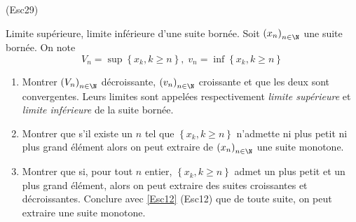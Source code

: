 \begin{tiny}(Esc29)\end{tiny} Limite supérieure, limite inférieure d'une suite bornée. \label{Esc29}
Soit $\left( x_n\right)_{n\in \N}$ une suite bornée. On note
\begin{displaymath}
  V_n=\sup \left\lbrace  x_k, k\geq n\right\rbrace,\; 
  v_n=\inf \left\lbrace  x_k, k\geq n\right\rbrace
\end{displaymath}
\begin{enumerate}
  \item Montrer $\left( V_n\right)_{n\in \N}$ décroissante, $\left( v_n\right)_{n\in \N}$ croissante et que les deux sont convergentes. Leurs limites sont appelées respectivement \emph{limite supérieure} et \emph{limite inférieure} de la suite bornée.
  \item Montrer que s'il existe un $n$ tel que $\left\lbrace  x_k, k\geq n\right\rbrace$ n'admette ni plus petit ni plus grand élément alors on peut extraire de $\left( x_n\right)_{n\in \N}$ une suite monotone.
  \item Montrer que si, pour tout $n$ entier, $\left\lbrace  x_k, k\geq n\right\rbrace$ admet un plus petit et un plus grand élément, alors on peut extraire des suites croissantes et décroissantes. Conclure avec \ref{Esc12} (Esc12) que de toute suite, on peut extraire une suite monotone.
\end{enumerate}
